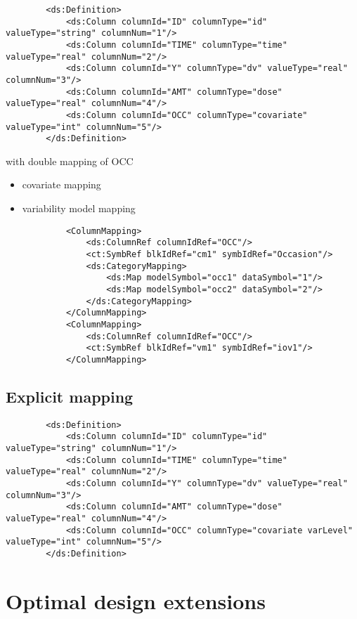 \lstset{language=XML}
\begin{lstlisting}
        <ds:Definition>
            <ds:Column columnId="ID" columnType="id" valueType="string" columnNum="1"/>
            <ds:Column columnId="TIME" columnType="time" valueType="real" columnNum="2"/>
            <ds:Column columnId="Y" columnType="dv" valueType="real" columnNum="3"/>
            <ds:Column columnId="AMT" columnType="dose" valueType="real" columnNum="4"/>
            <ds:Column columnId="OCC" columnType="covariate" valueType="int" columnNum="5"/>
        </ds:Definition>
\end{lstlisting}
with double mapping of OCC
\begin{itemize}
\item 
covariate mapping 
\item 
variability model mapping 
\end{itemize}

\lstset{language=XML}
\begin{lstlisting}
            <ColumnMapping>
                <ds:ColumnRef columnIdRef="OCC"/>
                <ct:SymbRef blkIdRef="cm1" symbIdRef="Occasion"/>
                <ds:CategoryMapping>
                    <ds:Map modelSymbol="occ1" dataSymbol="1"/>
                    <ds:Map modelSymbol="occ2" dataSymbol="2"/>
                </ds:CategoryMapping>
            </ColumnMapping>
            <ColumnMapping>
                <ds:ColumnRef columnIdRef="OCC"/>
                <ct:SymbRef blkIdRef="vm1" symbIdRef="iov1"/>
            </ColumnMapping>
\end{lstlisting}


\subsection{Explicit mapping}

\lstset{language=XML}
\begin{lstlisting}
        <ds:Definition>
            <ds:Column columnId="ID" columnType="id" valueType="string" columnNum="1"/>
            <ds:Column columnId="TIME" columnType="time" valueType="real" columnNum="2"/>
            <ds:Column columnId="Y" columnType="dv" valueType="real" columnNum="3"/>
            <ds:Column columnId="AMT" columnType="dose" valueType="real" columnNum="4"/>
            <ds:Column columnId="OCC" columnType="covariate varLevel" valueType="int" columnNum="5"/>
        </ds:Definition>
\end{lstlisting}


\section{Optimal design extensions}
\label{sec:OEDextentions}

